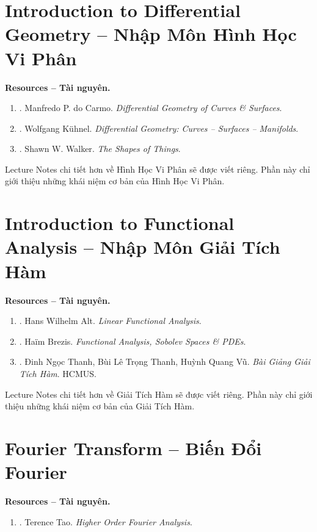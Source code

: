 \documentclass[oneside]{book}
\begin{document}
\part{Introduction to Differential Geometry -- Nhập Môn Hình Học Vi Phân}
\minitoc
\textbf{\textsf{Resources -- Tài nguyên.}}
\begin{enumerate}
	\item \cite{Carmo2016}. {\sc Manfredo P. do Carmo}. {\it Differential Geometry of Curves \& Surfaces}.
	
	\item \cite{Kuhnel2015}. {\sc Wolfgang K\"{u}hnel}. {\it Differential Geometry: Curves -- Surfaces -- Manifolds}.
	
	\item \cite{Walker2015}. {\sc Shawn W. Walker}. {\it The Shapes of Things}.
\end{enumerate}
Lecture Notes chi tiết hơn về Hình Học Vi Phân sẽ được viết riêng. Phần này chỉ giới thiệu những khái niệm cơ bản của Hình Học Vi Phân.


\part{Introduction to Functional Analysis -- Nhập Môn Giải Tích Hàm}
\minitoc
\textbf{\textsf{Resources -- Tài nguyên.}}
\begin{enumerate}
	\item \cite{Alt2016}. {\sc Hans Wilhelm Alt}. {\it Linear Functional Analysis}.
	
	\item \cite{Brezis2011}. {\sc Ha\"im Brezis}. {\it Functional Analysis, Sobolev Spaces \& PDEs}.
	
	\item \cite{Thanh_Thanh_Vu_gth}. {\sc Đinh Ngọc Thanh, Bùi Lê Trọng Thanh, Huỳnh Quang Vũ}. {\it Bài Giảng Giải Tích Hàm}. HCMUS.
\end{enumerate}
Lecture Notes chi tiết hơn về Giải Tích Hàm sẽ được viết riêng. Phần này chỉ giới thiệu những khái niệm cơ bản của Giải Tích Hàm.


\part{Fourier Transform -- Biến Đổi Fourier}
\minitoc
\textbf{\textsf{Resources -- Tài nguyên.}}
\begin{enumerate}
	\item \cite{Tao_Fourier_analysis}. {\sc Terence Tao}. {\it Higher Order Fourier Analysis}.
\end{enumerate}
\end{document}
